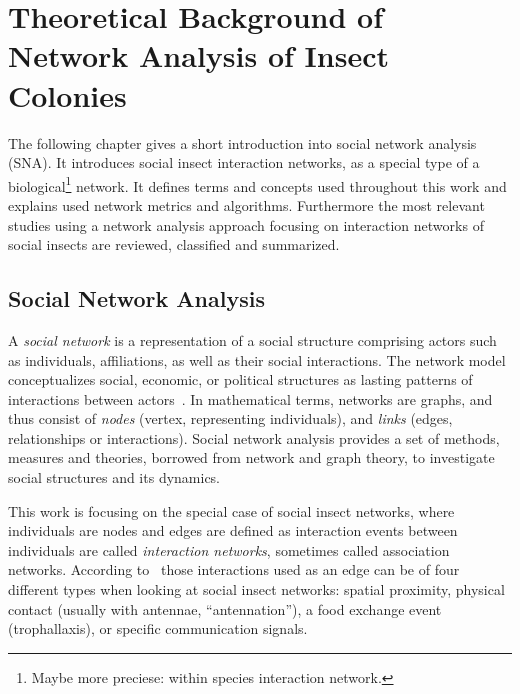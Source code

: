 \chapter{Theoretical Background of Network Analysis of Insect Colonies}
The following chapter gives a short introduction into social network analysis (SNA). It introduces social insect interaction networks, as a special type of a biological\footnote{Maybe more preciese: within species interaction network.} network. It defines terms and concepts used throughout this work and explains used network metrics and algorithms.
Furthermore the most relevant studies using a network analysis approach focusing on interaction networks of social insects are reviewed, classified and summarized.
\section{Social Network Analysis}
\label{ch:bg}

A \emph{social network} is a representation of a social structure comprising actors such as individuals, affiliations, as well as their social interactions.
The network model conceptualizes social, economic, or political structures as lasting patterns of interactions between actors~\cite{wasserman1994social}.
In mathematical terms, networks are graphs, and thus consist of \emph{nodes} (vertex, representing individuals), and \emph{links} (edges, relationships or interactions).
Social network analysis provides a set of methods, measures and theories, borrowed from network and graph theory, to investigate social structures and its dynamics.

This work is focusing on the special case of social insect networks, where individuals are nodes and edges are defined as interaction events between individuals are called \emph{interaction networks}, sometimes called association networks.
According to~\textcite{charbonneau2013social} those interactions used as an edge can be of four different types when looking at social insect networks: spatial proximity, physical contact (usually with antennae, “antennation”), a food exchange event (trophallaxis), or specific communication signals.

